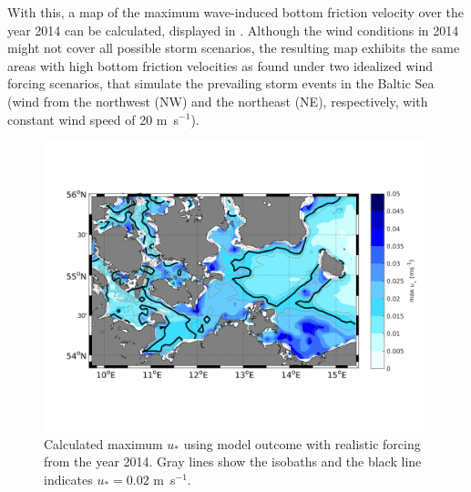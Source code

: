 With this, a map of the maximum wave-induced bottom friction velocity over the 
year 2014 can be calculated, displayed in . Although the wind 
conditions in 2014 might not cover all possible storm scenarios, the 
resulting map exhibits the same areas with high bottom friction velocities as 
found under two idealized wind forcing scenarios, that simulate the prevailing 
storm events in the Baltic Sea (wind from the northwest (NW) and the northeast 
(NE), respectively, with constant wind speed of 20 m~s$^{-1}$).

\begin{figure}[ht]
 \includegraphics[width=16cm]{bilder/ubot_real.png}
 \caption{Calculated maximum $u_\ast$ using model outcome with realistic 
forcing from the year 2014. Gray lines show the 
isobaths and the black line indicates $u_\ast = 0.02$ 
m~s$^{-1}$.\label{ustar_real}}
\end{figure}

